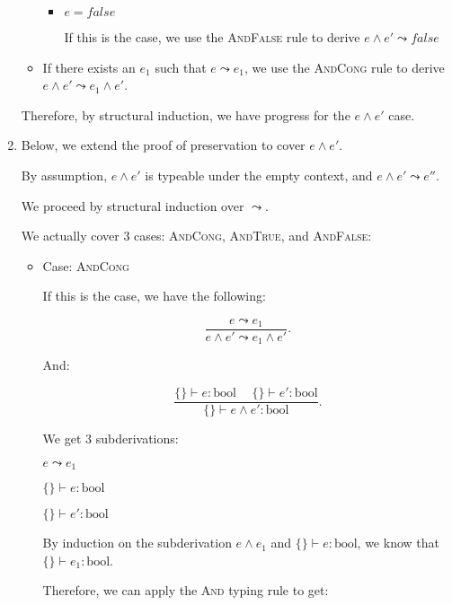 \begin{enumerate}
\begin{itemize}
\begin{itemize}
          \item
            $e = false$

            If this is the case, we use the \textsc{AndFalse} rule to derive $e \wedge e' \leadsto false$

        \end{itemize}

      \item
        If there exists an $e_1$ such that $e \leadsto e_1$, we use the \textsc{AndCong} rule to derive $e \wedge e' \leadsto e_1 \wedge e'$.
    \end{itemize}

    Therefore, by structural induction, we have progress for the $e \wedge e'$ case.

  \item
    Below, we extend the proof of preservation to cover $e \wedge e'$.

    By assumption, $e \wedge e'$ is typeable under the empty context, and $e \wedge e' \leadsto e''$.

    We proceed by structural induction over $\leadsto$.

    We actually cover 3 cases: \textsc{AndCong}, \textsc{AndTrue}, and \textsc{AndFalse}:

    \begin{itemize}
      \item
        Case: \textsc{AndCong}

        If this is the case, we have the following:

        \[
          \frac{e \leadsto e_1}{e \wedge e' \leadsto e_1 \wedge e'}
        .\] 

        And:

        \[
          \frac{\{\} \vdash e : \text{bool} \hspace{15pt} \{\} \vdash e' : \text{bool}}{\{\} \vdash e \wedge e' : \text{bool}} 
        .\] 

        We get 3 subderivations:

        $e \leadsto e_1$

        $\{\} \vdash e : \text{bool}$

        $\{\} \vdash e' : \text{bool}$

        By induction on the subderivation $e \wedge e_1$ and $\{\} \vdash e : \text{bool}$, we know that $\{\} \vdash e_1 : \text{bool}$.

        Therefore, we can apply the \textsc{And} typing rule to get:


\end{itemize}
\end{enumerate}
